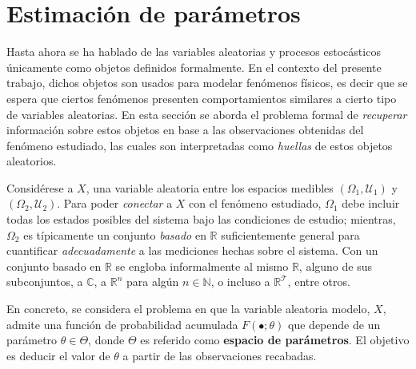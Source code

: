 \documentclass[12pt,letterpaper]{book}
\newtheorem{definicion}{Definición}[chapter]
\newcommand{\R}{\mathbb{R}}
\newcommand{\C}{\mathbb{C}}
\newcommand{\N}{\mathbb{N}}
\begin{document}

\section{Estimación de parámetros}

Hasta ahora se ha hablado de las variables aleatorias y procesos estocásticos únicamente como objetos definidos formalmente.
%
En el contexto del presente trabajo, dichos objetos son usados para modelar fenómenos físicos, es decir que se espera que ciertos fenómenos presenten comportamientos similares a cierto tipo de variables aleatorias.
%
%
En esta sección se aborda el problema formal de \textit{recuperar} información sobre estos objetos en base a las observaciones obtenidas del fenómeno estudiado, las cuales son interpretadas como \textit{huellas} de estos objetos aleatorios.


Considérese a $X$, una variable aleatoria entre los espacios medibles $(\Omega_1,\mathcal{U}_1)$ y $(\Omega_2,\mathcal{U}_2)$. 
%
Para poder \textit{conectar} a $X$ con el fenómeno estudiado, $\Omega_1$ debe incluir todas los estados posibles del sistema bajo las condiciones de estudio; mientras, $\Omega_2$ es típicamente un conjunto \textit{basado} en $\R$ suficientemente general para cuantificar \textit{adecuadamente} a las mediciones hechas sobre el sistema.
%
Con un conjunto basado en $\R$ se engloba informalmente al mismo $\R$, alguno de sus subconjuntos, a $\C$, a $\R^n$ para algún $n\in \N$, o incluso a $\R^\mathcal{T}$, entre otros.

En concreto, se considera el problema en que la variable aleatoria modelo, $X$, admite una función de probabilidad acumulada $F(\bullet; \theta)$ que depende de un parámetro $\theta \in \Theta$, donde $\Theta$ es referido como \textbf{espacio de parámetros}.
%
El objetivo es deducir el valor de $\theta$ a partir de las observaciones recabadas.
\end{document}
